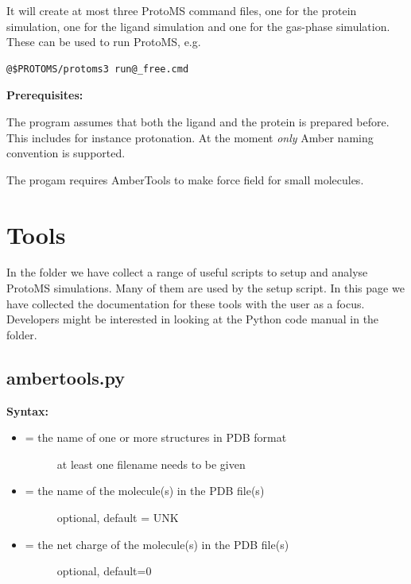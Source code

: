 \documentclass[letterpaper,10pt,english]{manual}
\begin{document}
It will create at most three ProtoMS command files, one for the protein simulation, one for the ligand simulation and one for the gas-phase simulation. These can be used to run ProtoMS, e.g.

\begin{Verbatim}[commandchars=@\[\]]
@$PROTOMS/protoms3 run@_free.cmd
\end{Verbatim}

\textbf{Prerequisites:}

The program assumes that both the ligand and the protein is prepared before. This includes for instance protonation. At the moment \emph{only} Amber naming convention is supported.

The progam requires AmberTools to make force field for small molecules.

\resetcurrentobjects
\hypertarget{--doc-tools}{}

\chapter{Tools}

In the  folder we have collect a range of useful scripts to setup and analyse ProtoMS simulations. Many of them are used by the  setup script. In this page we have collected the documentation for these tools with the user as a focus. Developers might be interested in looking at the Python code manual in the  folder.


\section{ambertools.py}

\textbf{Syntax:}

\begin{itemize}
\item {} \begin{description}
\item[{ = the name of one or more structures in PDB format}] \leavevmode
at least one filename needs to be given

\end{description}

\item {} \begin{description}
\item[{ = the name of the molecule(s) in the PDB file(s)}] \leavevmode
optional, default = UNK

\end{description}

\item {} \begin{description}
\item[{ = the net charge of the molecule(s) in the PDB file(s)}] \leavevmode
optional, default=0

\end{description}

\end{itemize}
\end{document}
